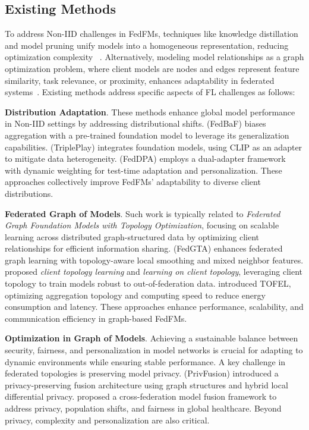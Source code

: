 \subsection{Existing Methods}

To address Non-IID challenges in FedFMs, techniques like knowledge distillation and model pruning unify models into a homogeneous representation, reducing optimization complexity~ \cite{fan2023fate,lachi2024graphfmscalableframeworkmultigraph}. Alternatively, modeling model relationships as a graph optimization problem, where client models are nodes and edges represent feature similarity, task relevance, or proximity, enhances adaptability in federated systems~\cite{yu2024netsafe, feng2024graphroutergraphbasedrouterllm}. Existing methods address specific aspects of FL challenges as follows:

\textbf{Distribution Adaptation}. These methods enhance global model performance in Non-IID settings by addressing distributional shifts. \citet{park2024fedbaffederatedlearningaggregation} (FedBaF) biases aggregation with a pre-trained foundation model to leverage its generalization capabilities. \citet{imteaj2024tripleplayenhancingfederatedlearning} (TriplePlay) integrates foundation models, using CLIP as an adapter to mitigate data heterogeneity. \citet{6-data-feddpa} (FedDPA) employs a dual-adapter framework with dynamic weighting for test-time adaptation and personalization. These approaches collectively improve FedFMs' adaptability to diverse client distributions.


\textbf{Federated Graph of Models}. Such work is typically related to \textit{Federated Graph Foundation Models with Topology Optimization}, focusing on scalable learning across distributed graph-structured data by optimizing client relationships for efficient information sharing. \citet{li2024fedgtatopologyawareaveragingfederated} (FedGTA) enhances federated graph learning with topology-aware local smoothing and mixed neighbor features. \citet{ma2024beyond} proposed \textit{client topology learning} and \textit{learning on client topology}, leveraging client topology to train models robust to out-of-federation data. \citet{huang2022accelerating} introduced TOFEL, optimizing aggregation topology and computing speed to reduce energy consumption and latency. These approaches enhance performance, scalability, and communication efficiency in graph-based FedFMs.  


\textbf{Optimization in Graph of Models}. Achieving a sustainable balance between security, fairness, and personalization in model networks is crucial for adapting to dynamic environments while ensuring stable performance. A key challenge in federated topologies is preserving model privacy. \citet{chen2024privfusion} (PrivFusion) introduced a privacy-preserving fusion architecture using graph structures and hybrid local differential privacy. \citet{chen2024model} proposed a cross-federation model fusion framework to address privacy, population shifts, and fairness in global healthcare. Beyond privacy, complexity and personalization are also critical. 


